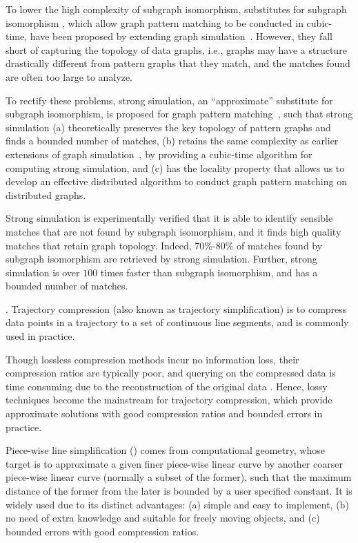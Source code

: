 To lower the high complexity of subgraph isomorphism, substitutes for subgraph isomorphism \cite{FanLMTWW10,FanLMTW11}, which allow graph pattern matching to be conducted in cubic-time, have been proposed by extending graph simulation~\cite{infsimu95}. However, they fall short of capturing the topology of data graphs, i.e., graphs may have a structure drastically different from pattern graphs that they match, and the matches found are often too large to analyze.

To rectify these problems, strong simulation, an ``approximate'' substitute for subgraph isomorphism, is proposed for graph pattern matching~\cite{tods-MaCFHW14}, such that strong simulation (a) theoretically preserves the key topology of pattern graphs and finds a bounded number of matches, (b) retains the same complexity as earlier extensions of graph simulation~\cite{FanLMTWW10,FanLMTW11}, by providing a cubic-time algorithm for computing strong simulation, and (c) has the locality property that allows us to develop an effective distributed algorithm to conduct graph pattern matching on distributed graphs.

Strong simulation is experimentally verified that it is able to identify sensible matches that are not found by subgraph isomorphism, and it finds high
quality matches that retain graph topology. Indeed, 70\%-80\% of matches found by subgraph
isomorphism are retrieved by strong simulation. Further, strong simulation is over $100$ times faster than subgraph isomorphism, and has a bounded number of matches.



.  Trajectory compression (also known as trajectory simplification) is to compress data points in a trajectory to a set of continuous line segments, and is commonly used  in practice.

Though lossless compression methods incur no information loss, their compression ratios are typically poor, and querying on the compressed data is time consuming due to the reconstruction of the original data \cite{Nibali:Trajic}. Hence, lossy techniques become the mainstream for trajectory compression,
which provide approximate solutions with good compression ratios and bounded errors in practice.


Piece-wise line simplification (\lsa) comes from computational geometry, whose target is to approximate a given finer piece-wise linear curve by another coarser piece-wise linear curve ({normally} a subset of the former), such that the maximum distance of the former from the later is bounded by a user specified constant. It is widely used due to its distinct advantages: (a) simple and easy to implement, (b) no need of extra knowledge and suitable for freely  moving  objects, and (c) bounded errors with good compression ratios.

